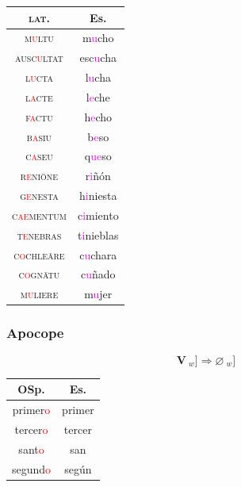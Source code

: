 \documentclass{report}[12pt]
\begin{document}
\begin{center}
  \begin{tabular}{c c}
    \textsc{lat.} & Es. \\
    \hline
    \textsc{m\textcolor{red}{u}ltu} & m\textcolor{magenta}{u}cho \\
    \textsc{ausc\textcolor{red}{u}ltat} & esc\textcolor{magenta}{u}cha \\
    \textsc{l\textcolor{red}{u}cta} & l\textcolor{magenta}{u}cha \\
    \textsc{l\textcolor{red}{a}cte} & l\textcolor{magenta}{e}che \\
    \textsc{f\textcolor{red}{a}ctu} & h\textcolor{magenta}{e}cho \\
    \textsc{b\textcolor{red}{a}siu} & b\textcolor{magenta}{e}so \\
    \textsc{c\textcolor{red}{a}seu} & q\textcolor{magenta}{ue}so \\
    \textsc{r\textcolor{red}{e}ni\={o}ne} & r\textcolor{magenta}{i}ñón \\
    \textsc{g\textcolor{red}{e}nesta} & h\textcolor{magenta}{i}niesta \\
    \textsc{c\textcolor{red}{ae}mentum} & c\textcolor{magenta}{i}miento \\
    \textsc{t\textcolor{red}{e}nebras} & t\textcolor{magenta}{i}nieblas \\
    \textsc{c\textcolor{red}{o}chle\={a}re} & c\textcolor{magenta}{u}chara \\
    \textsc{c\textcolor{red}{o}gn\={a}tu} & c\textcolor{magenta}{u}ñado \\
    \textsc{m\textcolor{red}{u}liere} & m\textcolor{magenta}ujer \\
  \end{tabular}
\end{center}

\subsubsection{Apocope}\label{sec:apocope}

\begin{tcolorbox}
  \[ \textbf{V}\ _w] \Rightarrow \varnothing\ _w] \]
\end{tcolorbox}

\begin{center}
  \begin{tabular}{c c}
    OSp. & Es. \\
    \hline
    primer\textcolor{red}{o} & primer \\
    tercer\textcolor{red}{o} & tercer \\
    sant\textcolor{red}{o} & san \\
    segund\textcolor{red}{o} & según \\
  \end{tabular}
\end{center}
\end{document}
